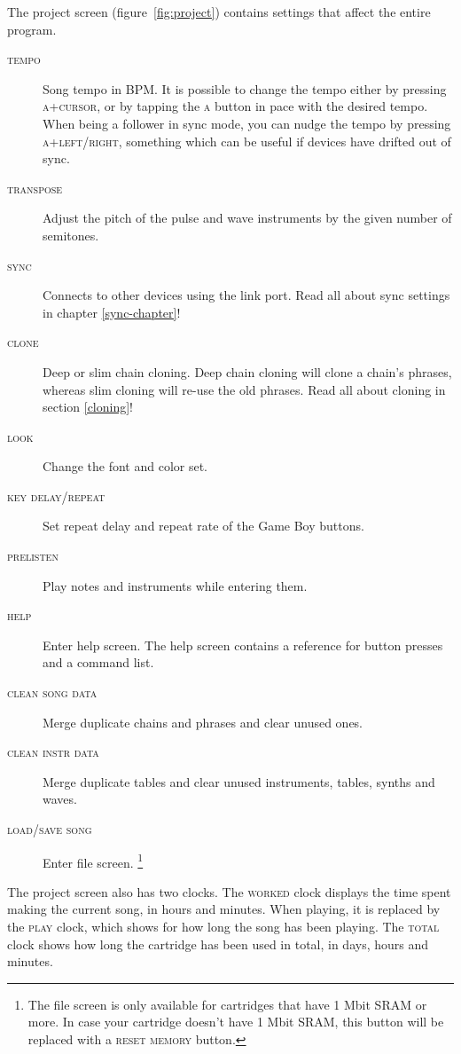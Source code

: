 The project screen (figure~\ref{fig:project}) contains settings that affect the entire program.

\begin{description}
	\item[\textsc{tempo}] Song tempo in BPM. It is possible to change the tempo either by pressing
\textsc{a+cursor}, or by tapping the \textsc{a} button in pace with the desired tempo. When being a
follower in sync mode, you can nudge the tempo by pressing \textsc{a+left/right}, something which
can be useful if devices have drifted out of sync.
	\item[\textsc{transpose}] Adjust the pitch of the pulse and wave instruments by the given number of semitones.
	\item[\textsc{sync}] Connects to other devices using the link port. Read all about sync settings in chapter \ref{sync-chapter}!

	\item[\textsc{clone}] Deep or slim chain cloning. Deep chain cloning will clone a chain's phrases, whereas slim cloning will re-use the old phrases. Read all about cloning in section \ref{cloning}!
	\item[\textsc{look}] Change the font and color set.
	\item[\textsc{key delay/repeat}] Set repeat delay and repeat rate of the Game Boy buttons.
	\item[\textsc{prelisten}] Play notes and instruments while entering them.

	\item[\textsc{help}] Enter help screen. The help screen contains a reference for button presses and a command list.
	\item[\textsc{clean song data}] Merge duplicate chains and phrases and clear unused ones. \label{clean-song-data}
	\item[\textsc{clean instr data}] Merge duplicate tables and clear unused instruments, tables, synths and waves.
	\item[\textsc{load/save song}] Enter file screen. \footnote{The file screen is only available for cartridges that have 1 Mbit SRAM or more. In case your cartridge doesn't have 1 Mbit SRAM, this button will be replaced with a \textsc{reset memory} button.}
\end{description}

The project screen also has two clocks.
The \textsc{worked} clock displays the time spent making the current song, in hours and minutes.
When playing, it is replaced by the \textsc{play} clock, which shows for how long the song has been playing.
The \textsc{total} clock shows how long the cartridge has been used in total, in days, hours and minutes.

